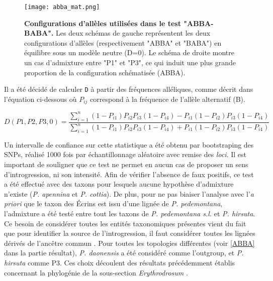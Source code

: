 \documentclass[../Master_report2.tex]{subfiles}
\begin{document}
\begin{figure}[!ht]
    \centering
    \texttt{[image: abba\_mat.png]}
    \caption{\textbf{Configurations d'allèles utilisées dans le test "ABBA-BABA".} Les deux schémas de gauche représentent les deux configurations d'allèles (respectivement "ABBA" et "BABA") en équilibre sous un modèle neutre (D=0).  Le schéma de droite montre un cas d'admixture entre "P1" et "P3", ce qui induit une plus grande proportion de la configuration schématisée (ABBA).}
    \label{abba-top}
    \centering
\end{figure} 
Il a été décidé de calculer \verb|D| à partir des fréquences alléliques, comme décrit dans l'équation ci-dessous où \textit{$P_{ij}$} correspond à la fréquence de l'allèle alternatif (B).

\[D(P1,P2,P3,0)=\frac{\sum_{i=1}^{n} (1-P_{i1})P_{i2}P_{i3}(1-P_{i4})-P_{i1}(1-P_{i2})P_{i3}(1-P_{i4})}{\sum_{i=1}^{n} (1-P_{i1})P_{i2}P_{i3}(1-P_{i4})+P_{i1}(1-P_{i2})P_{i3}(1-P_{i4})}\]

Un intervalle de confiance sur cette statistique a été obtenu par bootstraping des SNPs, réalisé 1000 fois par échantillonnage aléatoire avec remise des \textit{loci}.
Il est important de souligner que ce test ne permet en aucun cas de proposer un sens d'introgression, ni son intensité. Afin de vérifier l'absence de faux positifs, ce test a été effectué avec des taxons pour lesquels aucune hypothèse d'admixture n'existe (\textit{P. apennina} et \textit{P. cottia}). De plus, pour ne pas biaiser l'analyse avec l'\textit{a priori} que le taxon des Écrins est issu d'une lignée de \textit{P. pedemontana}, l'admixture a été testé entre tout les taxons de \textit{P. pedemontana s.l.} et \textit{P. hirsuta}. Ce besoin de considérer toutes les entités taxonomiques présentes vient du fait que pour identifier la source de l'introgression, il faut considérer toutes les lignées dérivés de l'ancêtre commun \citep{Eaton2015}. Pour toutes les topologies différentes (voir \ref{ABBA} dans la partie résultat), \textit{P. daonensis} a été considéré comme l'outgroup, et \textit{P. hirsuta} comme P3. Ces choix découlent des résultats précédemment établis concernant la phylogénie de la sous-section \textit{Erythrodrosum} \citep{Boucher2016a}.
\end{document}
